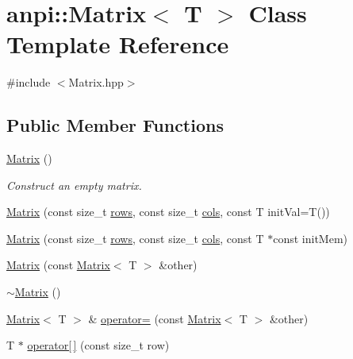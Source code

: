 \hypertarget{classanpi_1_1_matrix}{}\section{anpi\+:\+:Matrix$<$ T $>$ Class Template Reference}
\label{classanpi_1_1_matrix}


{\ttfamily \#include $<$Matrix.\+hpp$>$}

\subsection*{Public Member Functions}
\begin{DoxyCompactItemize}
\item 
\hypertarget{classanpi_1_1_matrix_a378f41ca6eba448d5aabbbbafc9110cf}{}\hyperlink{classanpi_1_1_matrix_a378f41ca6eba448d5aabbbbafc9110cf}{Matrix} ()\label{classanpi_1_1_matrix_a378f41ca6eba448d5aabbbbafc9110cf}

\begin{DoxyCompactList}\small\item\em Construct an empty matrix. \end{DoxyCompactList}\item 
\hyperlink{classanpi_1_1_matrix_a7e948c79bd875197a3850e03efc8bd5f}{Matrix} (const size\+\_\+t \hyperlink{classanpi_1_1_matrix_a4b786272497d9f67f120a226c1bfcff4}{rows}, const size\+\_\+t \hyperlink{classanpi_1_1_matrix_a5bd9f2fe255fe0390bfe880877222b2a}{cols}, const T init\+Val=T())
\item 
\hyperlink{classanpi_1_1_matrix_a3c37c93a58cbb831863ad3ad9dc73af6}{Matrix} (const size\+\_\+t \hyperlink{classanpi_1_1_matrix_a4b786272497d9f67f120a226c1bfcff4}{rows}, const size\+\_\+t \hyperlink{classanpi_1_1_matrix_a5bd9f2fe255fe0390bfe880877222b2a}{cols}, const T $\ast$const init\+Mem)
\item 
\hyperlink{classanpi_1_1_matrix_a336997e2f4cf238db9f2fb9992144f23}{Matrix} (const \hyperlink{classanpi_1_1_matrix}{Matrix}$<$ T $>$ \&other)
\item 
\hyperlink{classanpi_1_1_matrix_acd9cb8d3e7b77bb14d9ce6d153ac5634}{$\sim$\+Matrix} ()
\item 
\hyperlink{classanpi_1_1_matrix}{Matrix}$<$ T $>$ \& \hyperlink{classanpi_1_1_matrix_acba9e336b083b5d6b58fe24f7942ddbe}{operator=} (const \hyperlink{classanpi_1_1_matrix}{Matrix}$<$ T $>$ \&other)
\item 
\hypertarget{classanpi_1_1_matrix_a6bcaaad80bd2d631017472231f6d5e63}{}T $\ast$ \hyperlink{classanpi_1_1_matrix_a6bcaaad80bd2d631017472231f6d5e63}{operator\mbox{[}$\,$\mbox{]}} (const size\+\_\+t row)\label{classanpi_1_1_matrix_a6bcaaad80bd2d631017472231f6d5e63}


\end{DoxyCompactItemize}
